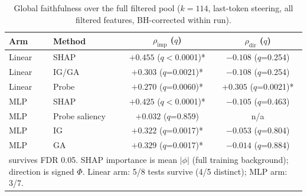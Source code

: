 \begin{table}[h!]
    \centering
    \caption{Global faithfulness over the full filtered pool ($k=114$, last-token steering, all filtered features, BH-corrected within run).}
    \label{tab:all-selection-faithfulness}
    \begin{tabular}{llcc}
    \toprule
    Arm & Method & $\rho_\text{imp}$ ($q$) & $\rho_\text{dir}$ ($q$) \\
    \midrule
    Linear & SHAP       & $+0.455$ ($q<$0.0001)* & $-0.108$ ($q$=0.254) \\
    Linear & IG/GA      & $+0.303$ ($q$=0.0021)* & $-0.108$ ($q$=0.254) \\
    Linear & Probe      & $+0.270$ ($q$=0.0060)* & $+0.305$ ($q$=0.0021)* \\
    \midrule
    MLP & SHAP           & $+0.425$ ($q<$0.0001)* & $-0.105$ ($q$=0.463) \\
    MLP & Probe saliency & $+0.032$ ($q$=0.859) & n/a \\
    MLP & IG             & $+0.322$ ($q$=0.0017)* & $-0.053$ ($q$=0.804) \\
    MLP & GA             & $+0.329$ ($q$=0.0017)* & $-0.014$ ($q$=0.884) \\
    \bottomrule
    \multicolumn{4}{l}{\footnotesize *survives FDR 0.05. SHAP importance is mean $|\phi|$ (full training background); direction is signed $\Phi$. Linear arm: 5/8 tests survive (4/5 distinct); MLP arm: 3/7.}
    \end{tabular}
    \end{table}